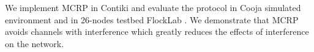 

We implement MCRP in Contiki and evaluate the protocol in Cooja simulated environment and in 26-nodes testbed FlockLab \cite{flocklab}. We demonstrate that MCRP avoids channels with interference which greatly reduces the effects of interference on the network.






